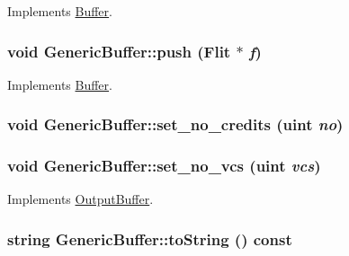 Implements \hyperlink{classBuffer_95f5c230f9c261bc13ddcfafcc340e7e}{Buffer}.\hypertarget{classGenericBuffer_c5a0781106485f9567898b49021f6346}{
\subsubsection[{push}]{\setlength{\rightskip}{0pt plus 5cm}void GenericBuffer::push ({\bf Flit} $\ast$ {\em f})}}
\label{classGenericBuffer_c5a0781106485f9567898b49021f6346}




Implements \hyperlink{classBuffer_c9dce1860c655146f000df30314caaa9}{Buffer}.\hypertarget{classGenericBuffer_222b1ccd9db0a123acb9f3d34d38881c}{
\subsubsection[{set\_\-no\_\-credits}]{\setlength{\rightskip}{0pt plus 5cm}void GenericBuffer::set\_\-no\_\-credits ({\bf uint} {\em no})}}
\label{classGenericBuffer_222b1ccd9db0a123acb9f3d34d38881c}


\hypertarget{classGenericBuffer_d955be71ad7a5f0bb408dccfb9fd45d3}{
\subsubsection[{set\_\-no\_\-vcs}]{\setlength{\rightskip}{0pt plus 5cm}void GenericBuffer::set\_\-no\_\-vcs ({\bf uint} {\em vcs})}}
\label{classGenericBuffer_d955be71ad7a5f0bb408dccfb9fd45d3}




Implements \hyperlink{classOutputBuffer_5fafb6827567941d238ae16991c5c1a8}{OutputBuffer}.\hypertarget{classGenericBuffer_3e9808bf28490fcc38ba13e7eb6ef501}{
\subsubsection[{toString}]{\setlength{\rightskip}{0pt plus 5cm}string GenericBuffer::toString () const}}
\label{classGenericBuffer_3e9808bf28490fcc38ba13e7eb6ef501}




